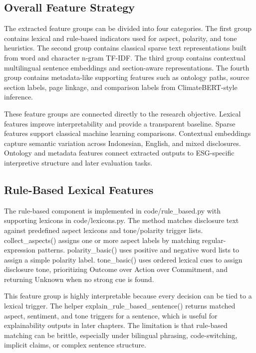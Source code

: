 \subsection{Overall Feature Strategy}

The extracted feature groups can be divided into four categories. The first group contains lexical and rule-based indicators used for aspect, polarity, and tone heuristics. The second group contains classical sparse text representations built from word and character n-gram TF-IDF. The third group contains contextual multilingual sentence embeddings and section-aware representations. The fourth group contains metadata-like supporting features such as ontology paths, source section labels, page linkage, and comparison labels from ClimateBERT-style inference.

These feature groups are connected directly to the research objective. Lexical features improve interpretability and provide a transparent baseline. Sparse features support classical machine learning comparisons. Contextual embeddings capture semantic variation across Indonesian, English, and mixed disclosures. Ontology and metadata features connect extracted outputs to ESG-specific interpretive structure and later evaluation tasks.

\subsection{Rule-Based Lexical Features}

The rule-based component is implemented in code/rule\_based.py with supporting lexicons in code/lexicons.py. The method matches disclosure text against predefined aspect lexicons and tone/polarity trigger lists. collect\_aspects() assigns one or more aspect labels by matching regular-expression patterns. polarity\_basic() uses positive and negative word lists to assign a simple polarity label. tone\_basic() uses ordered lexical cues to assign disclosure tone, prioritizing Outcome over Action over Commitment, and returning Unknown when no strong cue is found.

This feature group is highly interpretable because every decision can be tied to a lexical trigger. The helper explain\_rule\_based\_sentence() returns matched aspect, sentiment, and tone triggers for a sentence, which is useful for explainability outputs in later chapters. The limitation is that rule-based matching can be brittle, especially under bilingual phrasing, code-switching, implicit claims, or complex sentence structure.

